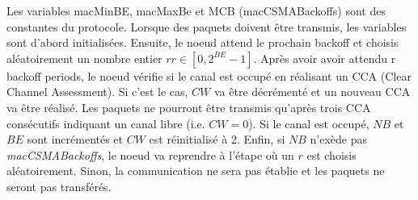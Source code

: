   Les variables macMinBE, macMaxBe et MCB (macCSMABackoffs) sont des constantes du protocole.
  Lorsque des paquets doivent être transmis, les variables sont d'abord initialisées.
  Ensuite, le noeud attend le prochain backoff et choisis aléatoirement un nombre entier
  $r r \in [0, 2^{BE}-1]$. Après avoir avoir attendu r backoff periods, le noeud vérifie
  si le canal est occupé en réalisant un CCA (Clear Channel Assessment).
  Si c'est le cas, $CW$ va être décrémenté et un nouveau CCA va être réalisé.
  Les paquets ne pourront être transmis qu'après trois CCA consécutifs indiquant un canal libre (i.e. $CW = 0$).
  Si le canal est occupé, $NB$ et $BE$ sont incrémentés et $CW$ est réinitialisé à 2.
  Enfin, si $NB$ n'exède pas \textit{macCSMABackoffs}, le noeud va reprendre à l'étape où un
  $r$ est choisis aléatoirement. Sinon, la communication ne sera pas établie et les paquets
  ne seront pas transférés.


